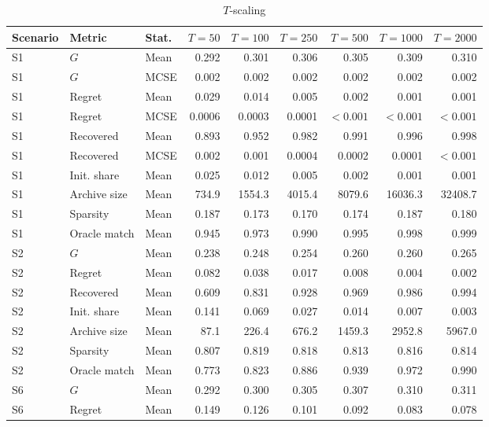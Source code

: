 \documentclass[a4paper,12pt]{article}
\newcommand{\1}{\mathbf{1}}
\begin{document}
\begin{landscape}
\begin{table}[p]
\centering
\caption{$T$-scaling}
\label{tab:ia_mc_T_scaling}
\scriptsize
\begin{adjustbox}{max width=\linewidth}
\begin{tabular}{@{}lllrrrrrr@{}}
\toprule
Scenario & Metric & Stat. & $T=50$ & $T=100$ & $T=250$ & $T=500$ & $T=1000$ & $T=2000$ \\
\midrule
S1 & $G$ & Mean & 0.292 & 0.301 & 0.306 & 0.305 & 0.309 & 0.310 \\
S1 & $G$ & MCSE & 0.002 & 0.002 & 0.002 & 0.002 & 0.002 & 0.002 \\
S1 & Regret & Mean & 0.029 & 0.014 & 0.005 & 0.002 & 0.001 & 0.001 \\
S1 & Regret & MCSE & 0.0006 & 0.0003 & 0.0001 & $<0.001$ & $<0.001$ & $<0.001$ \\
S1 & Recovered & Mean & 0.893 & 0.952 & 0.982 & 0.991 & 0.996 & 0.998 \\
S1 & Recovered & MCSE & 0.002 & 0.001 & 0.0004 & 0.0002 & 0.0001 & $<0.001$ \\
S1 & Init. share & Mean & 0.025 & 0.012 & 0.005 & 0.002 & 0.001 & 0.001 \\
S1 & Archive size & Mean & 734.9 & 1554.3 & 4015.4 & 8079.6 & 16036.3 & 32408.7 \\
S1 & Sparsity & Mean & 0.187 & 0.173 & 0.170 & 0.174 & 0.187 & 0.180 \\
S1 & Oracle match & Mean & 0.945 & 0.973 & 0.990 & 0.995 & 0.998 & 0.999 \\
\midrule
S2 & $G$ & Mean & 0.238 & 0.248 & 0.254 & 0.260 & 0.260 & 0.265 \\
S2 & Regret & Mean & 0.082 & 0.038 & 0.017 & 0.008 & 0.004 & 0.002 \\
S2 & Recovered & Mean & 0.609 & 0.831 & 0.928 & 0.969 & 0.986 & 0.994 \\
S2 & Init. share & Mean & 0.141 & 0.069 & 0.027 & 0.014 & 0.007 & 0.003 \\
S2 & Archive size & Mean & 87.1 & 226.4 & 676.2 & 1459.3 & 2952.8 & 5967.0 \\
S2 & Sparsity & Mean & 0.807 & 0.819 & 0.818 & 0.813 & 0.816 & 0.814 \\
S2 & Oracle match & Mean & 0.773 & 0.823 & 0.886 & 0.939 & 0.972 & 0.990 \\
\midrule
S6 & $G$ & Mean & 0.292 & 0.300 & 0.305 & 0.307 & 0.310 & 0.311 \\
S6 & Regret & Mean & 0.149 & 0.126 & 0.101 & 0.092 & 0.083 & 0.078 \\

\end{tabular}
\end{adjustbox}
\end{table}
\end{landscape}
\end{document}
